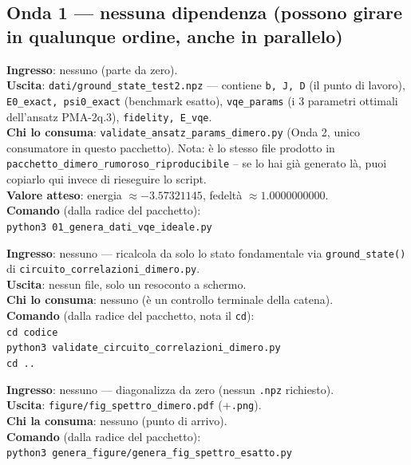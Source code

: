 \documentclass[11pt,a4paper]{article}
\newcommand{\code}[1]{\texttt{\small #1}}
\begin{document}
\subsection{Onda 1 --- nessuna dipendenza (possono girare in qualunque ordine, anche in parallelo)}

\begin{keyeq}[title={01\_genera\_dati\_vqe\_ideale.py}]
\textbf{Ingresso}: nessuno (parte da zero).\\
\textbf{Uscita}: \code{dati/ground\_state\_test2.npz} --- contiene
\code{b, J, D} (il punto di lavoro), \code{E0\_exact, psi0\_exact}
(benchmark esatto), \code{vqe\_params} (i 3 parametri ottimali
dell'ansatz PMA-2q.3), \code{fidelity, E\_vqe}.\\
\textbf{Chi lo consuma}: \code{validate\_ansatz\_params\_dimero.py}
(Onda 2, unico consumatore in questo pacchetto). Nota: è lo stesso file
prodotto in \code{pacchetto\_dimero\_rumoroso\_riproducibile} -- se lo hai
già generato là, puoi copiarlo qui invece di rieseguire lo script.\\
\textbf{Valore atteso}: energia $\approx-3.57321145$, fedeltà $\approx1.0000000000$.\\
\textbf{Comando} (dalla radice del pacchetto):\\
\code{python3 01\_genera\_dati\_vqe\_ideale.py}
\end{keyeq}

\begin{keyeq}[title={validate\_circuito\_correlazioni\_dimero.py}]
\textbf{Ingresso}: nessuno --- ricalcola da solo lo stato fondamentale
via \code{ground\_state()} di \code{circuito\_correlazioni\_dimero.py}.\\
\textbf{Uscita}: nessun file, solo un resoconto a schermo.\\
\textbf{Chi lo consuma}: nessuno (è un controllo terminale della catena).\\
\textbf{Comando} (dalla radice del pacchetto, nota il \code{cd}):\\
\code{cd codice}\\
\code{python3 validate\_circuito\_correlazioni\_dimero.py}\\
\code{cd ..}
\end{keyeq}

\begin{keyeq}[title={genera\_fig\_spettro\_esatto.py}]
\textbf{Ingresso}: nessuno --- diagonalizza da zero (nessun \code{.npz} richiesto).\\
\textbf{Uscita}: \code{figure/fig\_spettro\_dimero.pdf} (+\code{.png}).\\
\textbf{Chi la consuma}: nessuno (punto di arrivo).\\
\textbf{Comando} (dalla radice del pacchetto):\\
\code{python3 genera\_figure/genera\_fig\_spettro\_esatto.py}
\end{keyeq}
\end{document}
